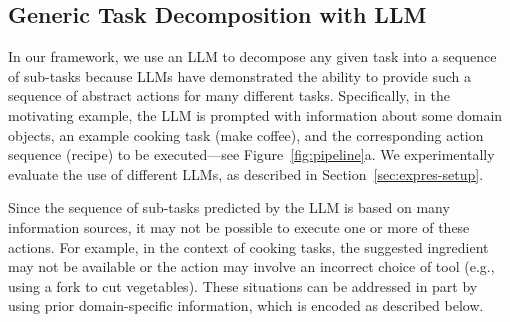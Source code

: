 \subsection{Generic Task Decomposition with LLM}
\label{sec:framework-llm}
In our framework, we use an LLM to decompose any given task into a sequence of sub-tasks because LLMs have demonstrated the ability to provide such a sequence of abstract actions for many different tasks. Specifically, in the motivating example, the LLM is prompted with information about some domain objects, an example cooking task (make coffee), and the corresponding action sequence (recipe) to be executed---see Figure~\ref{fig:pipeline}a. We experimentally evaluate the use of different LLMs, as described in Section~\ref{sec:expres-setup}. 

\vspace{-0.75em}
Since the sequence of sub-tasks predicted by the LLM is based on many information sources, it may not be possible to execute one or more of these actions. For example, in the context of cooking tasks, the suggested ingredient may not be available or the action may involve an incorrect choice of tool (e.g., using a fork to cut vegetables). These situations can be addressed in part by using prior domain-specific information, which is encoded as described below.

